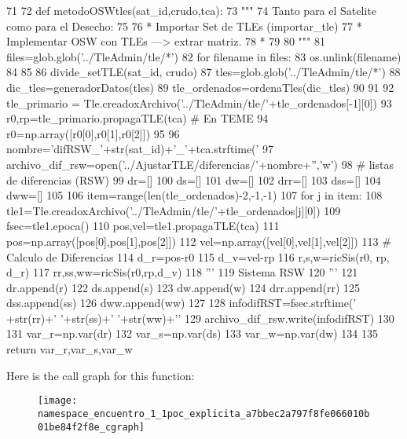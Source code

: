 \begin{DoxyCode}
71 
72 def metodoOSWtles(sat_id,crudo,tca):
73     """
74      Tanto para el Satelite como para el Desecho:
75     
76     * Importar Set de TLEs (importar_tle)
77     * Implementar OSW con TLEs ---> extrar matriz.
78     * 
79     
80     """
81     files=glob.glob('../TleAdmin/tle/*')
82     for filename in files:
83         os.unlink(filename)
84    
85     
86     divide_setTLE(sat_id, crudo)
87     tles=glob.glob('../TleAdmin/tle/*')
88     dic_tles=generadorDatos(tles)
89     tle_ordenados=ordenaTles(dic_tles)
90     
91     
92     tle_primario = Tle.creadoxArchivo('../TleAdmin/tle/'+tle_ordenados[-1][0])
93     r0,rp=tle_primario.propagaTLE(tca) # En TEME
94     r0=np.array([r0[0],r0[1],r0[2]])
95         
96     nombre='difRSW_'+str(sat_id)+'_'+tca.strftime('%
97     archivo_dif_rsw=open('../AjustarTLE/diferencias/'+nombre+'','w')
98     # listas de diferencias (RSW)
99     dr=[]
100     ds=[]
101     dw=[]
102     drr=[]
103     dss=[]
104     dww=[]
105 
106     item=range(len(tle_ordenados)-2,-1,-1)       
107     for j in item:
108         tle1=Tle.creadoxArchivo('../TleAdmin/tle/'+tle_ordenados[j][0])
109         fsec=tle1.epoca()
110         pos,vel=tle1.propagaTLE(tca)
111         pos=np.array([pos[0],pos[1],pos[2]])
112         vel=np.array([vel[0],vel[1],vel[2]]) 
113         # Calculo de Diferencias
114         d_r=pos-r0
115         d_v=vel-rp
116         r,s,w=ricSis(r0, rp, d_r)
117         rr,ss,ww=ricSis(r0,rp,d_v)
118         '''
119         Sistema RSW
120         '''
121         dr.append(r)
122         ds.append(s)
123         dw.append(w)
124         drr.append(rr)
125         dss.append(ss)
126         dww.append(ww)
127         
128         infodifRST=fsec.strftime('%
      +str(rr)+' '+str(ss)+' '+str(ww)+'\n'
129         archivo_dif_rsw.write(infodifRST)
130     
131     var_r=np.var(dr)
132     var_s=np.var(ds)
133     var_w=np.var(dw)
134     
135     return var_r,var_s,var_w

\end{DoxyCode}


\-Here is the call graph for this function\-:\nopagebreak
\begin{figure}[H]
\begin{center}
\leavevmode
\texttt{[image: namespace\_encuentro\_1\_1poc\_explicita\_a7bbec2a797f8fe066010b01be84f2f8e\_cgraph]}
\end{center}
\end{figure}



